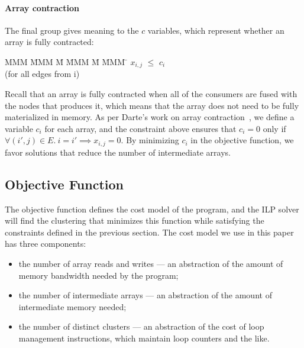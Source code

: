 

\paragraph{Array contraction} The final group gives meaning to the $c$ variables, which represent whether an array is fully contracted:
\begin{tabbing}
MMM     \= MMM \= M \= MMM \= M \= MMM \= \kill
        \> $x_{i,j}$    \> $\le$ \> $c_i$  \> \> \\
        \> (for all edges from i)
\end{tabbing}

Recall that an array is fully contracted when all of the consumers are fused with the nodes that produces it, which means that the array does not need to be fully materialized in memory. As per Darte's work on array contraction~\cite{darte2002contraction}, we define a variable $c_i$ for each array, and the constraint above ensures that $c_i = 0$ only if $\forall (i',j) \in E.\ i = i' \implies x_{i,j} = 0$. By minimizing $c_i$ in the objective function, we favor solutions that reduce the number of intermediate arrays.


\subsection{Objective Function}
\label{clustering:s:ObjectiveFunction}
The objective function defines the cost model of the program, and the ILP solver will find the clustering that minimizes this function while satisfying the constraints defined in the previous section. The cost model we use in this paper has three components:
\begin{itemize}
\item
the number of array reads and writes --- an abstraction of the amount of memory bandwidth needed by the program; 
\item
the number of intermediate arrays --- an abstraction of the amount of intermediate memory needed; 
\item
the number of distinct clusters --- an abstraction of the cost of loop management instructions, which maintain loop counters and the like.
\end{itemize}

